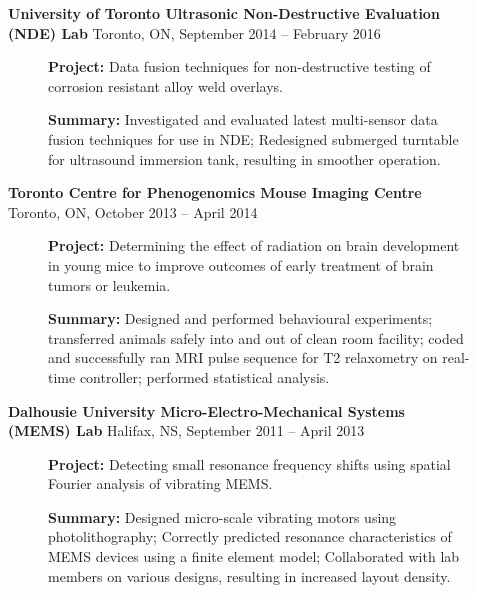 \documentclass[10pt]{article}
\begin{document}
\begin{description}
\item[]\textbf{University of Toronto Ultrasonic Non-Destructive Evaluation (NDE) Lab}\newline{}%
Toronto, ON, September 2014 -- February 2016
    \begin{description}
      \item[]\textbf{Project:} Data fusion techniques for non-destructive testing of corrosion resistant alloy weld overlays.
      \item[]\textbf{Summary:} Investigated and evaluated latest multi-sensor data fusion techniques for use in NDE; Redesigned submerged turntable for ultrasound immersion tank, resulting in smoother operation.
    \end{description}

\newpage

\item[] \textbf{Toronto Centre for Phenogenomics Mouse Imaging Centre}\newline{}%
Toronto, ON, October 2013 -- April 2014
  \begin{description}
      \item[]\textbf{Project:} Determining the effect of radiation on brain development in young mice to improve outcomes of early treatment of brain tumors or leukemia.
      \item[]\textbf{Summary:} Designed and performed behavioural experiments; transferred animals safely into and out of clean room facility; coded and successfully ran MRI pulse sequence for T2 relaxometry on real-time controller; performed statistical analysis.
  \end{description}

\item[]\textbf{Dalhousie University Micro-Electro-Mechanical Systems (MEMS) Lab} \newline{}%
Halifax, NS, September 2011 -- April 2013
    \begin{description}
      \item[]\textbf{Project:} Detecting small resonance frequency shifts using spatial Fourier analysis of vibrating MEMS.
      \item[]\textbf{Summary:} Designed micro-scale vibrating motors using photolithography; Correctly predicted resonance characteristics of MEMS devices using a finite element model; Collaborated with lab members on various designs, resulting in increased layout density.
      \end{description}
\end{description}
\end{document}
